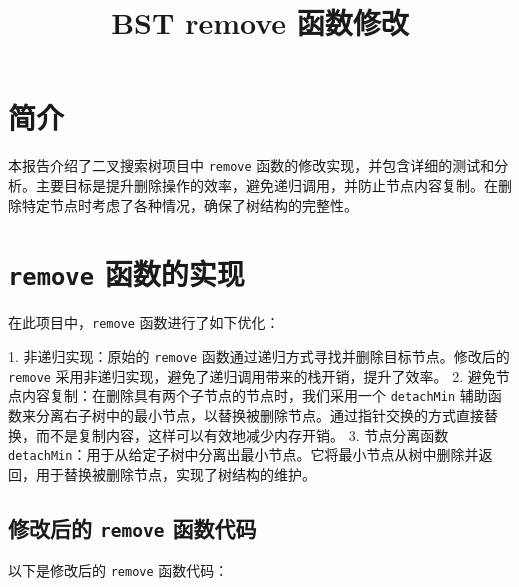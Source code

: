 \documentclass{article}
\title{BST remove 函数修改}
\author{}
\date{}
\begin{document}
\maketitle

\section{简介}
本报告介绍了二叉搜索树项目中 \texttt{remove} 函数的修改实现，并包含详细的测试和分析。主要目标是提升删除操作的效率，避免递归调用，并防止节点内容复制。在删除特定节点时考虑了各种情况，确保了树结构的完整性。

\section{\texttt{remove} 函数的实现}
在此项目中，\texttt{remove} 函数进行了如下优化：

1. 非递归实现：原始的 \texttt{remove} 函数通过递归方式寻找并删除目标节点。修改后的 \texttt{remove} 采用非递归实现，避免了递归调用带来的栈开销，提升了效率。
2. 避免节点内容复制：在删除具有两个子节点的节点时，我们采用一个 \texttt{detachMin} 辅助函数来分离右子树中的最小节点，以替换被删除节点。通过指针交换的方式直接替换，而不是复制内容，这样可以有效地减少内存开销。
3. 节点分离函数 \texttt{detachMin}：用于从给定子树中分离出最小节点。它将最小节点从树中删除并返回，用于替换被删除节点，实现了树结构的维护。

\subsection{修改后的 \texttt{remove} 函数代码}
以下是修改后的 \texttt{remove} 函数代码：
\end{document}
